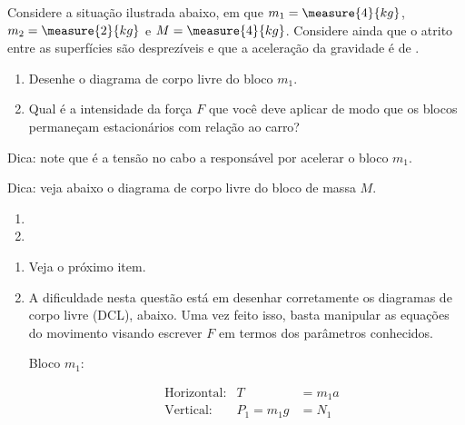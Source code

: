 \begin{question}
	Considere a situação ilustrada abaixo, em que $m_1 = \measure{4}{kg}$, $m_2 = \measure{2}{kg}$ e $M = \measure{4}{kg}$.
	Considere ainda que o atrito entre as superfícies são desprezíveis e que a aceleração da gravidade é de .


	\begin{enumerate}
		\item Desenhe o diagrama de corpo livre do bloco $m_1$.
		\item Qual é a intensidade da força $F$ que você deve aplicar de modo que os blocos permaneçam estacionários com relação ao carro?
	\end{enumerate}
	\begin{compactdesc}
		\item[Dica:] note que é a tensão no cabo a responsável por acelerar o bloco $m_1$.
		\item[Dica:] veja abaixo o diagrama de corpo livre do bloco de massa $M$.

	\end{compactdesc}

	\begin{answer}
		\begin{enumerate}
			\item \raisebox{-\height}{\texttt{[image: 20181029\_214004]}}
			\item {}
		\end{enumerate}
	\end{answer}

	\begin{solution}
		\begin{enumerate}
			\item Veja o próximo item.
			\item A dificuldade nesta questão está em desenhar corretamente os diagramas de corpo livre (DCL), abaixo.
			Uma vez feito isso, basta manipular as equações do movimento visando escrever $F$ em termos dos parâmetros conhecidos.
		
			\smallskip

			\begin{minipage}[t]{0.3\textwidth}
				\noindent
				Bloco $m_1$:


				\begin{align}
					&\text{Horizontal:}& T &= m_1 a \label{eq:m1x}\\
					&\text{Vertical:}& P_1 = m_1 g &= N_1 \label{eq:m1y}
				\end{align}


\end{minipage}
\end{enumerate}
\end{solution}
\end{question}
